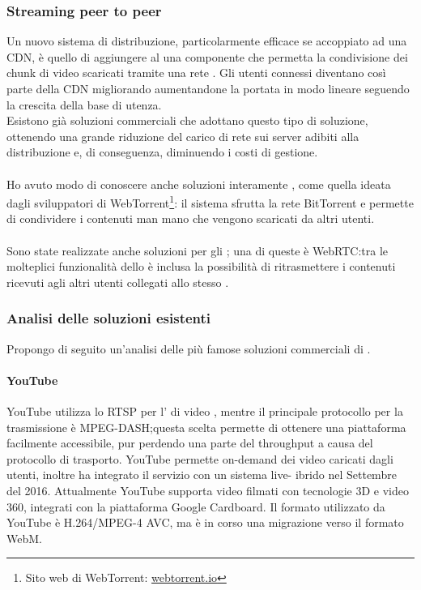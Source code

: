 	\subsubsection{Streaming peer to peer}
	Un nuovo sistema di distribuzione, particolarmente efficace se accoppiato ad una \gls{CDN}, è quello di aggiungere al  una componente che permetta la condivisione dei chunk di video scaricati tramite una rete . Gli utenti connessi diventano così parte della \gls{CDN} migliorando aumentandone la portata in modo lineare seguendo la crescita della base di utenza.
	\\
	Esistono già soluzioni commerciali che adottano questo tipo di soluzione, ottenendo una grande riduzione del carico di rete sui server adibiti alla distribuzione e, di conseguenza, diminuendo i costi di gestione.
	\paragraph*{}
	Ho avuto modo di conoscere anche soluzioni interamente , come quella ideata dagli sviluppatori di WebTorrent\footnote{Sito web di WebTorrent: \href{https://webtorrent.io/}{webtorrent.io}}: il sistema sfrutta la rete BitTorrent e permette di condividere i contenuti man mano che vengono scaricati da altri utenti.
	\paragraph*{}
	Sono state realizzate anche soluzioni  per gli  ; una di queste è WebRTC:\@ tra le molteplici funzionalità dello  è inclusa la possibilità di ritrasmettere i contenuti ricevuti agli altri utenti collegati allo stesso .

	\subsubsection{Analisi delle soluzioni esistenti}
	Propongo di seguito un'analisi delle più famose soluzioni commerciali di .
		\paragraph{YouTube}
		YouTube utilizza lo  \gls{RTSP} per l' di  video , mentre il principale protocollo per la trasmissione è MPEG-DASH;\@ questa scelta permette di ottenere una piattaforma facilmente accessibile, pur perdendo una parte del throughput a causa del protocollo di trasporto. YouTube permette  on-demand dei video caricati dagli utenti, inoltre ha integrato il servizio con un sistema live- ibrido nel Settembre del 2016. Attualmente YouTube supporta video filmati con tecnologie 3D e video 360\textdegree, integrati con la piattaforma Google Cardboard. Il formato  utilizzato da YouTube è H.264/MPEG-4 AVC, ma è in corso una migrazione verso il formato WebM.

